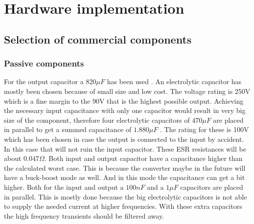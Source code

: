 
\chapter{Hardware implementation} \label{ch:hardware_implementation}


\section{Selection of commercial components}

\subsection{Passive components}
For the output capacitor a $820\mu F$ has been used \cite{cout}. An electrolytic capacitor has mostly been chosen because of small size and low cost. The voltage rating is 250V which is a fine margin to the 90V that is the highest possible output.  
Achieving the necessary input capacitance with only one capacitor would result in very big size of the component, therefore four electrolytic capacitors of $470\mu F$ \cite{cin} are placed in parallel to get a summed capacitance of $1.880\mu F$ . The rating for these is 100V which has been chosen in case the output is connected to the input by accident. In this case that will not ruin the input capacitor. These ESR resistances will be about $0.047\Omega$. Both input and output capacitor have a capacitance higher than the calculated worst case. This is because the converter maybe in the future will have a buck-boost mode as well. And in this mode the capacitance can get a bit higher. 
Both for the input and output a $100nF$ and a $1\mu F$  capacitors are placed in parallel. This is mostly done because the big electrolytic capacitors is not able to supply the needed current at higher frequencies. With these extra capacitors the high frequency transients should be filtered away.

